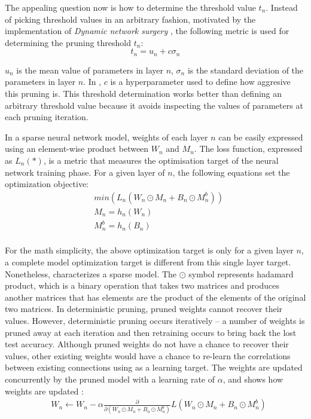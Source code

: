 \documentclass[a4paper,12pt]{report}
\begin{document}
The appealing question now is how to determine the threshold value $t_n$.
Instead of picking threshold values in an arbitrary fashion, motivated by the
implementation of \textit{Dynamic network surgery} \cite{Guo}, the
following metric is used for determining the pruning threshold $t_n$:
\begin{equation}
  t_n = u_n + c \sigma_n
  \label{equ:tn}
\end{equation}

$u_n$ is the mean value of parameters in layer $n$,
$\sigma_n$ is the standard deviation of the parameters in layer $n$.
In , $c$ is a hyperparameter used to define how aggresive this
pruning is.
This threshold determination works better than defining an arbitrary threshold
value because it avoids inspecting the values of parameters at each pruning
iteration.

In a sparse neural network model, weights of each layer $n$ can be easily
expressed using an element-wise product between $W_n$ and $M_n$.
The loss function, expressed as $L_n(*)$, is a metric that measures the optimisation
target of the neural network training phase.
For a given layer of $n$, the following equations set the optimization
objective:
\begin{equation}
  \begin{aligned}
    & min(L_n(W_n \odot M_n + B_n \odot M^b_n)) \\
    & M_n = h_n(W_n) \\
    & M^{b}_n = h_n(B_n) \\
  \end{aligned}
  \label{equ:minfunc}
\end{equation}

For the math simplicity, the above optimization target is only for a given layer $n$,
a complete model optimization target is different from this single layer target.
Nonetheless,  characterizes a sparse model.
The $\odot$ symbol represents hadamard product, which is a binary operation
that takes two matrices and produces another matrices that has elements are the
product of the elements of the original two matrices.
In deterministic pruning, pruned weights cannot recover their values.
However, deterministic pruning occurs iteratively -- a number of weights is pruned
away at each iteration and then retraining occurs to bring back the lost test accuracy.
Although pruned weights do not have a chance to recover their values, other
existing weights would have a chance to re-learn the correlations between existing
connections using  as a learning target.
The weights are updated concurrently by the pruned
model with a learning rate of $\alpha$, and  shows
how weights are updated \cite{Guo}:
\begin{equation}
  \begin{aligned}
    & W_{n} \leftarrow W_{n} - \alpha \frac{\partial}{\partial(W_n \odot M_n + B_n \odot M^b_n)} L(W_n \odot M_n + B_n \odot M^b_n)
  \end{aligned}
  \label{equ:trainfunc}
\end{equation}
\end{document}
